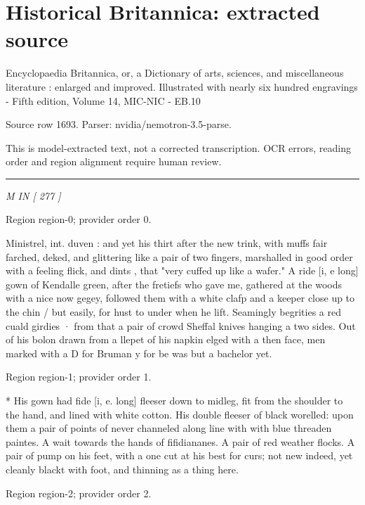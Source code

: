 \documentclass[11pt]{article}
\begin{document}
\section*{Historical Britannica: extracted source}
Encyclopaedia Britannica, or, a Dictionary of arts, sciences, and miscellaneous literature : enlarged and improved. Illustrated with nearly six hundred engravings - Fifth edition, Volume 14, MIC-NIC - EB.10\par
{\small Source row 1693. Parser: nvidia/nemotron-3.5-parse.\par}
{\small This is model-extracted text, not a corrected transcription. OCR errors, reading order and region alignment require human review.\par}
\hrule\medskip
{\small\itshape M IN [ 277 ]\par}

{\scriptsize\color{gray} Region region-0; provider order 0.\par}
\medskip

Ministrel, int. duven : and yet his thirt after the new trink, with muffs fair farched, deked, and glittering like a pair of two fingers, marshalled in good order with a feeling flick, and dints , that "very cuffed up like a wafer." A ride [i, e long] gown of Kendalle green, after the fretiefs who gave me, gathered at the woods with a nice now gegey, followed them with a white clafp and a keeper close up to the chin / but easily, for hust to under when he lift. Seamingly begrities a red cuald girdies · from that a pair of crowd Sheffal knives hanging a two sides. Out of his bolon drawn from a llepet of his napkin elged with a then face, men marked with a D for Bruman y for be was but a bachelor yet.
\par

{\scriptsize\color{gray} Region region-1; provider order 1.\par}
\medskip

* His gown had fide [i, e. long] fleeser down to midleg, fit from the shoulder to the hand, and lined with white cotton. His double fleeser of black worelled: upon them a pair of points of never channeled along line with with blue threaden paintes. A wait towards the hands of fifidiananes. A pair of red weather flocks. A pair of pump on his feet, with a one cut at his best for curs; not new indeed, yet cleanly blackt with foot, and thinning as a thing here.
\par

{\scriptsize\color{gray} Region region-2; provider order 2.\par}
\medskip
\end{document}
